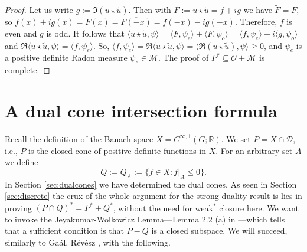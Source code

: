 \documentclass[[a4paper,english,12pt]{amsart}
\newcommand{\wt}[1]{\widetilde{#1}}
\theoremstyle{plain}
\newtheorem{lemma}[theorem]{Lemma}
\newtheorem{proposition}[theorem]{Proposition}
\theoremstyle{remark}
\newcommand{\magenta}[1]{{\color{magenta}{#1}}}
\newcommand{\ft}[1]{\widehat{#1}}
\newcommand{\DD}{{\mathcal D}}
\newcommand{\MM}{\mathcal{M}}
\newcommand{\OO}{\mathcal{O}}
\newcommand{\RR}{\mathbb R}
\newcommand{\oA}{\overline{A}}
\begin{document}
\begin{proof}
Let us write $g:=\Im (u\star \wt u)$. Then with $F:=u \star \widetilde{u}=f+ig$ we have  $\widetilde{F}=F$, so $f(x)+ig(x)=F(x)=\overline{F(-x)}=f(-x)-ig(-x)$. Therefore, $f$ is even and $g$ is odd. It follows that $\langle u \star \widetilde{u},\psi \rangle=\langle F,\psi_e \rangle + \langle F,\psi_o\rangle =\langle  f , \psi_e\rangle + i\langle g,\psi_o \rangle$ and $\Re \langle u \star \widetilde{u},\psi \rangle=\langle  f ,\psi_e\rangle$. So, $\langle f,\psi_e \rangle = \Re \langle u \star \widetilde{u},\psi \rangle = \langle  \Re (u \star \widetilde{u}), \psi\rangle \ge 0$, and $\psi_e$ is a positive definite Radon measure $\psi_e \in \MM$. The proof of $P^* \subseteq  \OO + \MM$ is complete.
\end{proof}


\section{A dual cone intersection formula}\label{sec:Dual-Cone-Intersection}


%
Recall the definition of the Banach space $X=C^{\infty,1}(G;\RR)$.
We set $P=X\cap \DD$, i.e., $P$ is the closed cone of positive definite functions in $X$. For an arbitrary set $A$ we define
\[
Q:=Q_A:=\{f\in X:f|_A\leq 0\}.
\]
In Section \ref{sec:dualcones} we have determined the dual cones.
As seen in Section \ref{sec:discrete} the crux of the whole argument for the strong duality result is lies  in proving $(P\cap Q)^*=P^*+Q^*$, without the need for weak$^*$ closure here. We want to invoke the Jeyakumar-Wolkowicz Lemma---Lemma 2.2 (a) in \cite{JeyaWolf}---which tells that a sufficient condition is that $P-Q$ is a closed subspace. We will succeed, similarly to Ga\'al, R\'ev\'esz \cite{Zeitschrift}, with the following.
\end{document}
